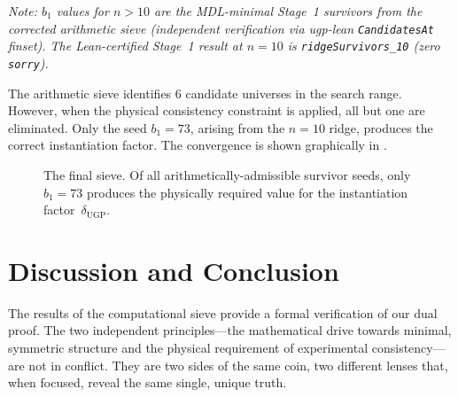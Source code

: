 \documentclass[11pt,twocolumn]{article}
\theoremstyle{remark}
\begin{document}
\noindent\footnotesize\textit{Note: $b_1$ values for $n>10$ are the MDL-minimal Stage~1 survivors from the corrected arithmetic sieve (independent verification via ugp-lean \texttt{CandidatesAt} finset). The Lean-certified Stage~1 result at $n=10$ is \texttt{ridgeSurvivors\_10} (zero \texttt{sorry}).}\normalsize

The arithmetic sieve identifies 6 candidate universes in the search range. However, when the physical consistency constraint is applied, all but one are eliminated. Only the seed $b_1=73$, arising from the $n=10$ ridge, produces the correct instantiation factor. The convergence is shown graphically in .

\begin{figure}[h!]
    \centering
    \caption{The final sieve. Of all arithmetically-admissible survivor seeds, only $b_1=73$ produces the physically required value for the instantiation factor~$\delta_{\text{UGP}}$.}
    \label{fig:sieve_plot}
\end{figure}

\section{Discussion and Conclusion}
The results of the computational sieve provide a formal verification of our dual proof. The two independent principles—the mathematical drive towards minimal, symmetric structure and the physical requirement of experimental consistency—are not in conflict. They are two sides of the same coin, two different lenses that, when focused, reveal the same single, unique truth.
\end{document}
